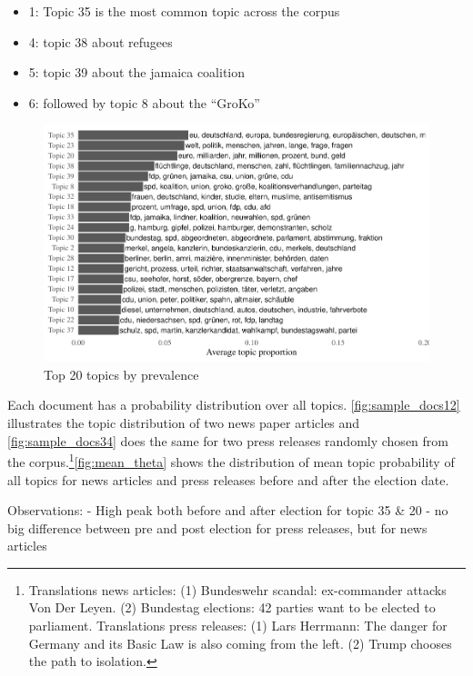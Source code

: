 \documentclass[
]{article}
\providecommand{\tightlist}{%
  \setlength{\itemsep}{0pt}\setlength{\parskip}{0pt}}
\begin{document}
\begin{itemize}
\tightlist
\item
  1: Topic 35 is the most common topic across the corpus
\item
  4: topic 38 about refugees
\item
  5: topic 39 about the jamaica coalition
\item
  6: followed by topic 8 about the ``GroKo''
\end{itemize}

\begin{figure}

{\centering \includegraphics[width=0.6\linewidth]{main_text_files/figure-latex/Topic distribution-1} 

}

\caption{Top 20 topics by prevalence \label{fig:topic_distribution}}\label{fig:Topic distribution}
\end{figure}

Each document has a probability distribution over all topics.
\autoref{fig:sample_docs12} illustrates the topic distribution of two
news paper articles and \autoref{fig:sample_docs34} does the same for
two press releases randomly chosen from the corpus.\footnote{Translations
  news articles: (1) Bundeswehr scandal: ex-commander attacks Von Der
  Leyen. (2) Bundestag elections: 42 parties want to be elected to
  parliament. Translations press releases: (1) Lars Herrmann: The danger
  for Germany and its Basic Law is also coming from the left. (2) Trump
  chooses the path to isolation.}\autoref{fig:mean_theta} shows the
distribution of mean topic probability of all topics for news articles
and press releases before and after the election date.

Observations: - High peak both before and after election for topic 35 \&
20 - no big difference between pre and post election for press releases,
but for news articles
\end{document}
